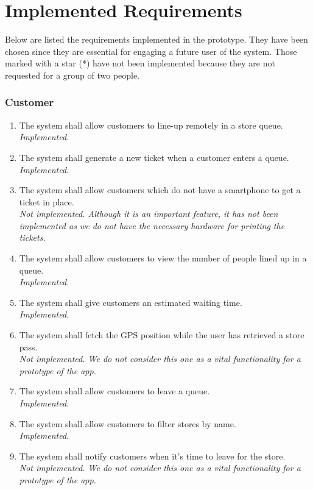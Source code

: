 \chapter{Implemented Requirements}
Below are listed the requirements implemented in the prototype. They have been chosen since they are essential for engaging a future user of the system.\newline
Those marked with a star (*) have not been implemented because they are not requested for a group of two people.

\subsection{Customer}
\begin{enumerate}[series=requirements, label=\textbf{R.\arabic*}]
    \item The system shall allow customers to line-up remotely in a store queue.\\[4pt] \textit{Implemented.}
    \item The system shall generate a new ticket when a customer enters a queue.\\[4pt] \textit{Implemented.}
    \item The system shall allow customers which do not have a smartphone to get a ticket in place.\\[4pt] \textit{Not implemented. Although it is an important feature, it has not been implemented as we do not have the necessary hardware for printing the tickets.}
    \item The system shall allow customers to view the number of people lined up in a queue.\\[4pt] \textit{Implemented.}
    \item The system shall give customers an estimated waiting time.\\[4pt] \textit{Implemented.}
    \item The system shall fetch the GPS position while the user has retrieved a store pass.\\[4pt] \textit{Not implemented. We do not consider this one as a vital functionality for a prototype of the app.}
    \item The system shall allow customers to leave a queue.\\[4pt] \textit{Implemented.}
    \item The system shall allow customers to filter stores by name.\\[4pt] \textit{Implemented.}
    \item The system shall notify customers when it's time to leave for the store.\\[4pt] \textit{Not implemented. We do not consider this one as a vital functionality for a prototype of the app.}

\end{enumerate}

